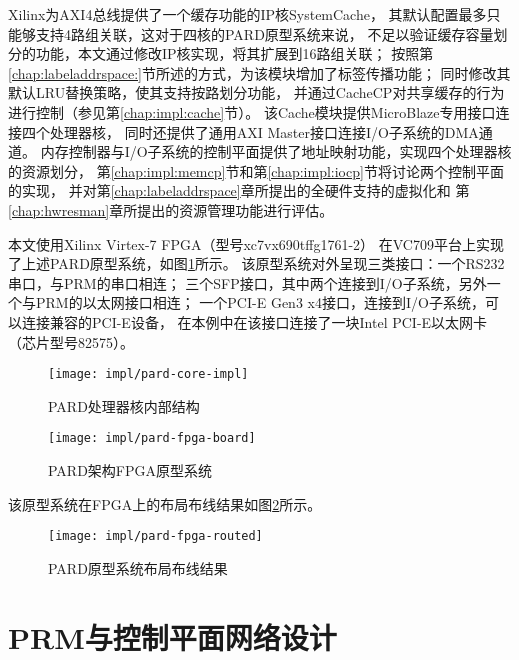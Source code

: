 Xilinx为AXI4总线提供了一个缓存功能的IP核SystemCache\cite{pg118-system-cache}，
其默认配置最多只能够支持4路组关联，这对于四核的PARD原型系统来说，
不足以验证缓存容量划分的功能，本文通过修改IP核实现，将其扩展到16路组关联；
按照第\ref{chap:labeladdrspace:}节所述的方式，为该模块增加了标签传播功能；
同时修改其默认LRU替换策略，使其支持按路划分功能，
并通过CacheCP对共享缓存的行为进行控制（参见第\ref{chap:impl:cache}节）。
该Cache模块提供MicroBlaze专用接口连接四个处理器核，
同时还提供了通用AXI Master接口连接I/O子系统的DMA通道。
内存控制器与I/O子系统的控制平面提供了地址映射功能，实现四个处理器核的资源划分，
第\ref{chap:impl:memcp}节和第\ref{chap:impl:iocp}节将讨论两个控制平面的实现，
并对第\ref{chap:labeladdrspace}章所提出的全硬件支持的虚拟化和
第\ref{chap:hwresman}章所提出的资源管理功能进行评估。

本文使用Xilinx Virtex-7 FPGA（型号xc7vx690tffg1761-2）
在VC709平台上实现了上述PARD原型系统，如图\ref{fig:pard-fpga-board}所示。
该原型系统对外呈现三类接口：一个RS232串口，与PRM的串口相连；
三个SFP接口，其中两个连接到I/O子系统，另外一个与PRM的以太网接口相连；
一个PCI-E Gen3 x4接口，连接到I/O子系统，可以连接兼容的PCI-E设备，
在本例中在该接口连接了一块Intel PCI-E以太网卡（芯片型号82575）。

\begin{figure}[tb]
\begin{minipage}{0.48\textwidth}
  \centering
  \texttt{[image: impl/pard-core-impl]}
  \caption{PARD处理器核内部结构}
  \label{fig:pard-core-impl}
\end{minipage}\hfill
\begin{minipage}{0.48\textwidth}
  \centering
  \texttt{[image: impl/pard-fpga-board]}
  \caption{PARD架构FPGA原型系统}
  \label{fig:pard-fpga-board}
\end{minipage}
\end{figure}

该原型系统在FPGA上的布局布线结果如图\ref{fig:pard-fpga-routed}所示。

\begin{figure}[tb]
  \centering
  \texttt{[image: impl/pard-fpga-routed]}
  \caption{PARD原型系统布局布线结果}
  \label{fig:pard-fpga-routed}
\end{figure}



\section{PRM与控制平面网络设计}

